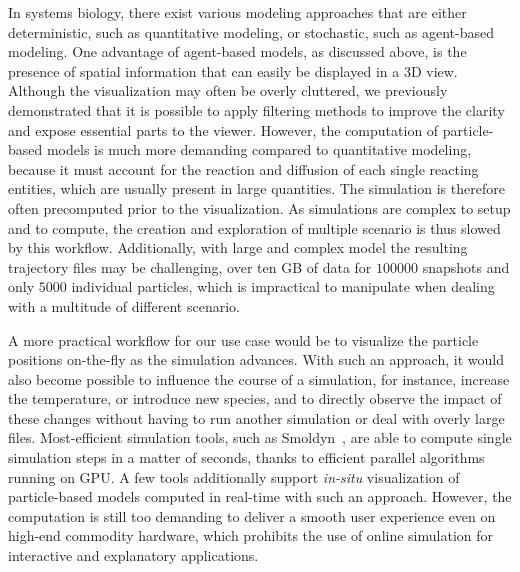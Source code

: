 In systems biology, there exist various modeling approaches that are either deterministic, such as quantitative modeling, or stochastic, such as agent-based modeling.
One advantage of agent-based models, as discussed above, is the presence of spatial information that can easily be displayed in a 3D view.
Although the visualization may often be overly cluttered, we previously demonstrated that it is possible to apply filtering methods to improve the clarity and expose essential parts to the viewer.
However, the computation of particle-based models is much more demanding compared to quantitative modeling, because it must account for the reaction and diffusion of each single reacting entities, which are usually present in large quantities.
The simulation is therefore often precomputed prior to the visualization.
As simulations are complex to setup and to compute, the creation and exploration of multiple scenario is thus slowed by this workflow.
Additionally, with large and complex model the resulting trajectory files may be challenging, over ten GB of data for $100000$ snapshots and only $5000$ individual particles, which is impractical to manipulate when dealing with a multitude of different scenario.

A more practical workflow for our use case would be to visualize the particle positions on-the-fly as the simulation advances.
With such an approach, it would also become possible to influence the course of a simulation, for instance, increase the temperature, or introduce new species, and to directly observe the impact of these changes without having to run another simulation or deal with overly large files.
Most-efficient simulation tools, such as Smoldyn~\cite{andrews2010detailed}, are able to compute single simulation steps in a matter of seconds, thanks to efficient parallel algorithms running on GPU.
A few tools additionally support \textit{in-situ} visualization of particle-based models computed in real-time with such an approach.
However, the computation is still too demanding to deliver a smooth user experience even on high-end commodity hardware, which prohibits the use of online simulation for interactive and explanatory applications.

